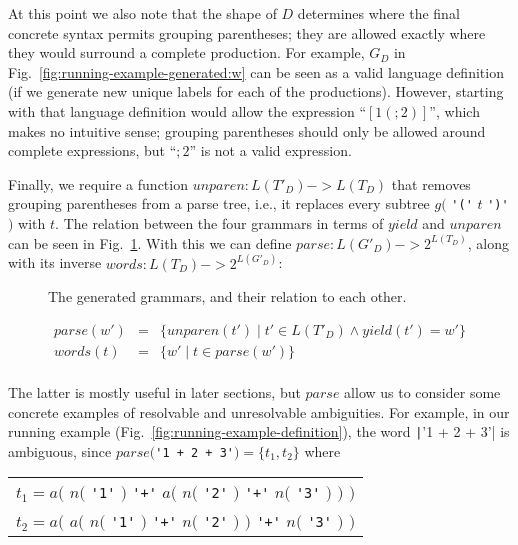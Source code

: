 \documentclass[acmsmall,review,anonymous]{acmart}\settopmatter{printfolios=true,printccs=false,printacmref=false}
\newcommand{\yield}{\mathit{yield}} %
\newcommand{\semantic}{\mathit{unparen}} %
\newcommand{\parse}{\mathit{parse}} %
\newcommand{\words}{\mathit{words}} %
\begin{document}
At this point we also note that the shape of $D$ determines where the final concrete syntax permits grouping parentheses; they are allowed exactly where they would surround a complete production. For example, $G_D$ in Fig.~\ref{fig:running-example-generated:w} can be seen as a valid language definition (if we generate new unique labels for each of the productions). However, starting with that language definition would allow the expression ``$[1(;2)]$'', which makes no intuitive sense; grouping parentheses should only be allowed around complete expressions, but ``$;2$'' is not a valid expression.

Finally, we require a function $\semantic : L(T'_D) -> L(T_D)$ that removes grouping parentheses from a parse tree, i.e., it replaces every subtree $g($ \verb|'('| $t$ \verb|')'| $)$ with $t$. The relation between the four grammars in terms of $\yield$ and $\semantic$ can be seen in Fig.~\ref{fig:grammar-square}. With this we can define $\parse : L(G'_D) -> 2^{L(T_D)}$, along with its inverse $\words : L(T_D) -> 2^{L(G'_D)}$:

\begin{figure}
  \caption{The generated grammars, and their relation to each other.}
  \label{fig:grammar-square}
\end{figure}

$$
\begin{array}{rcl}
\parse(w') & = & \{ \semantic(t') \mid t' \in L(T'_D) \land \yield(t') = w' \} \\
\words(t) & = & \{ w' \mid t \in \parse(w') \} \\
\end{array}
$$

\noindent The latter is mostly useful in later sections, but $\parse$ allow us to consider some concrete examples of resolvable and unresolvable ambiguities. For example, in our running example (Fig.~\ref{fig:running-example-definition}), the word \texttt|'1 + 2 + 3'| is ambiguous, since $\parse($\verb|'1 + 2 + 3'|$) = \{t_1, t_2\}$ where

\begin{center}
  \begin{tabular}{l}
    $t_1 = a($ \hphantom{$a($} $n($ \verb|'1'| $)$ \verb|'+'| $a($ $n($ \verb|'2'| $)$ \hphantom{$)$} \verb|'+'| $n($ \verb|'3'| $)$ $)$ $)$ \\
    $t_2 = a($ $a($ $n($ \verb|'1'| $)$ \verb|'+'| \hphantom{$a($} $n($ \verb|'2'| $)$ $)$ \verb|'+'| $n($ \verb|'3'| $)$ \hphantom{$)$} $)$ \\
  \end{tabular}
\end{center}
\end{document}
